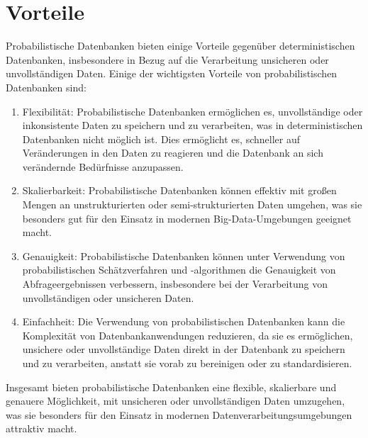 \chapter{Vorteile}
Probabilistische Datenbanken bieten einige Vorteile gegenüber deterministischen Datenbanken, insbesondere in Bezug auf die Verarbeitung unsicheren oder unvollständigen Daten. Einige der wichtigsten Vorteile von probabilistischen Datenbanken sind:

\begin{enumerate}
	\item Flexibilität: Probabilistische Datenbanken ermöglichen es, unvollständige oder inkonsistente Daten zu speichern und zu verarbeiten, was in deterministischen Datenbanken nicht möglich ist. Dies ermöglicht es, schneller auf Veränderungen in den Daten zu reagieren und die Datenbank an sich verändernde Bedürfnisse anzupassen.
	
	\item Skalierbarkeit: Probabilistische Datenbanken können effektiv mit großen Mengen an unstrukturierten oder semi-strukturierten Daten umgehen, was sie besonders gut für den Einsatz in modernen Big-Data-Umgebungen geeignet macht.
	
	\item Genauigkeit: Probabilistische Datenbanken können unter Verwendung von probabilistischen Schätzverfahren und -algorithmen die Genauigkeit von Abfrageergebnissen verbessern, insbesondere bei der Verarbeitung von unvollständigen oder unsicheren Daten.
	
	\item Einfachheit: Die Verwendung von probabilistischen Datenbanken kann die Komplexität von Datenbankanwendungen reduzieren, da sie es ermöglichen, unsichere oder unvollständige Daten direkt in der Datenbank zu speichern und zu verarbeiten, anstatt sie vorab zu bereinigen oder zu standardisieren.
	
\end{enumerate}

Insgesamt bieten probabilistische Datenbanken eine flexible, skalierbare und genauere Möglichkeit, mit unsicheren oder unvollständigen Daten umzugehen, was sie besonders für den Einsatz in modernen Datenverarbeitungsumgebungen attraktiv macht.



